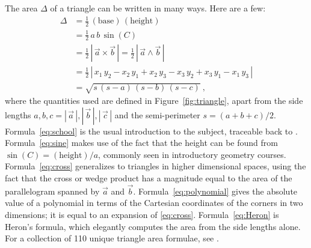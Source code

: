 \documentclass[10pt]{article}
\newcommand{\secbreak}{\bigskip{\centering\footnotesize $\triangle~~~\triangle~~~\triangle$\par}\bigskip\noindent}
\newcommand{\abs}[1]{|\,{#1}\,|}
\begin{document}
\secbreak
The area $\Delta$ of a triangle can be written in many ways.
Here are a few:
\begin{align}
\Delta 
&= \frac{1}{2} \, (\text{base}) \, (\text{height}) \label{eq:school} \\
&= \frac{1}{2}\,a\,b\,\sin(C) \label{eq:sine} \\
&= \frac{1}{2}\, \abs{\vec{a} \times \vec{b}}
    = \frac{1}{2}\, \abs{\vec{a} \wedge \vec{b}}\label{eq:cross} \\
&= \frac{1}{2}\, \abs{
    x_1 \, y_2 - x_2 \, y_1 +
    x_2 \, y_3 - x_3 \, y_2 +
    x_3 \, y_1 - x_1 \, y_3
}\label{eq:polynomial} \\
&= \sqrt{s\,(s-a)\,(s-b)\,(s-c)} \label{eq:Heron} ~,
\end{align}
where the quantities used are defined in Figure~\ref{fig:triangle}, apart from the side lengths
$a, b, c = \abs{\vec{a}}, \abs{\vec{b}}, \abs{\vec{c}}$
and the semi-perimeter $s = (a + b + c)/2$.
Formula~\eqref{eq:school} is the usual introduction to the subject, traceable back to \citet{Euclid300BC}.
Formula~\eqref{eq:sine} makes use of the fact that the height can be found from $\sin(C) = (\text{height}) / a$, commonly seen in introductory geometry courses.
Formula~\eqref{eq:cross} generalizes to triangles in higher dimensional spaces, using the fact that the cross or wedge product has a magnitude equal to the area of the parallelogram spanned by $\vec{a}$ and $\vec{b}$.
Formula~\eqref{eq:polynomial} gives the absolute value of a polynomial in terms of the Cartesian coordinates of the corners in two dimensions; it is equal to an expansion of \eqref{eq:cross}.
Formula~\eqref{eq:Heron} is Heron's formula, which elegantly computes the area from the side lengths alone.
For a collection of 110 unique triangle area formulae, see \citet{Baker1885a,Baker1885b}.
\end{document}
